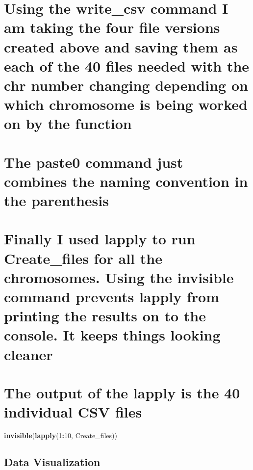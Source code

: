 \documentclass[
]{article}
\newenvironment{Shaded}{\begin{snugshade}}{\end{snugshade}}
\newcommand{\DecValTok}[1]{\textcolor[rgb]{0.00,0.00,0.81}{#1}}
\newcommand{\FunctionTok}[1]{\textcolor[rgb]{0.13,0.29,0.53}{\textbf{#1}}}
\newcommand{\NormalTok}[1]{#1}
\newcommand{\SpecialCharTok}[1]{\textcolor[rgb]{0.81,0.36,0.00}{\textbf{#1}}}
\begin{document}
\section{Using the write\_csv command I am taking the four file versions
created above and saving them as each of the 40 files needed with the
chr number changing depending on which chromosome is being worked on by
the
function}\label{using-the-write_csv-command-i-am-taking-the-four-file-versions-created-above-and-saving-them-as-each-of-the-40-files-needed-with-the-chr-number-changing-depending-on-which-chromosome-is-being-worked-on-by-the-function}

\section{The paste0 command just combines the naming convention in the
parenthesis}\label{the-paste0-command-just-combines-the-naming-convention-in-the-parenthesis}

\section{Finally I used lapply to run Create\_files for all the
chromosomes. Using the invisible command prevents lapply from printing
the results on to the console. It keeps things looking
cleaner}\label{finally-i-used-lapply-to-run-create_files-for-all-the-chromosomes.-using-the-invisible-command-prevents-lapply-from-printing-the-results-on-to-the-console.-it-keeps-things-looking-cleaner}

\section{The output of the lapply is the 40 individual CSV
files}\label{the-output-of-the-lapply-is-the-40-individual-csv-files}

\begin{Shaded}
\begin{Highlighting}[]
\FunctionTok{invisible}\NormalTok{(}\FunctionTok{lapply}\NormalTok{(}\DecValTok{1}\SpecialCharTok{:}\DecValTok{10}\NormalTok{, Create\_files))}
\end{Highlighting}
\end{Shaded}

\subsection{Data Visualization}\label{data-visualization}
\end{document}
